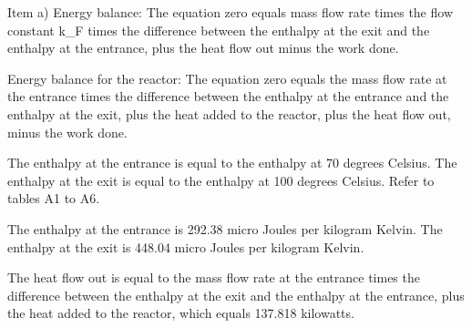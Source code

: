 Item a) Energy balance:
The equation zero equals mass flow rate times the flow constant k_F times the difference between the enthalpy at the exit and the enthalpy at the entrance, plus the heat flow out minus the work done.

Energy balance for the reactor:
The equation zero equals the mass flow rate at the entrance times the difference between the enthalpy at the entrance and the enthalpy at the exit, plus the heat added to the reactor, plus the heat flow out, minus the work done.

The enthalpy at the entrance is equal to the enthalpy at 70 degrees Celsius.
The enthalpy at the exit is equal to the enthalpy at 100 degrees Celsius.
Refer to tables A1 to A6.

The enthalpy at the entrance is 292.38 micro Joules per kilogram Kelvin.
The enthalpy at the exit is 448.04 micro Joules per kilogram Kelvin.

The heat flow out is equal to the mass flow rate at the entrance times the difference between the enthalpy at the exit and the enthalpy at the entrance, plus the heat added to the reactor, which equals 137.818 kilowatts.